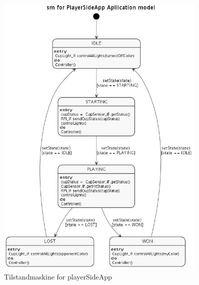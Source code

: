 \documentclass[Rapport/Rapport_main.tex]{subfiles}
\begin{document}
\begin{figure}[H]
    \centering
    \includegraphics[width=0.9\textwidth]{Arkitektur/Softwarearkitektur/Applikationsmodel/PlayerSide/graphics/state.png}
    \caption{Tilstandmaskine for playerSideApp}
    \label{fig:playerSide_SM}
\end{figure}
\end{document}

